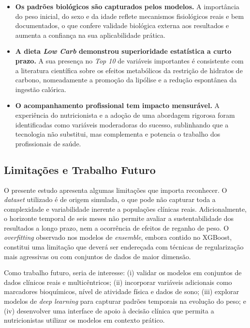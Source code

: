 \begin{itemize}
    \item \textbf{Os padrões biológicos são capturados pelos modelos.} A importância do peso inicial, do sexo e da idade reflete mecanismos fisiológicos reais e bem documentados, o que confere validade biológica externa aos resultados e aumenta a confiança na sua aplicabilidade prática.

    \item \textbf{A dieta \textit{Low Carb} demonstrou superioridade estatística a curto prazo.} A sua presença no \textit{Top 10} de variáveis importantes é consistente com a literatura científica sobre os efeitos metabólicos da restrição de hidratos de carbono, nomeadamente a promoção da lipólise e a redução espontânea da ingestão calórica.

    \item \textbf{O acompanhamento profissional tem impacto mensurável.} A experiência do nutricionista e a adoção de uma abordagem rigorosa foram identificadas como variáveis moderadoras do sucesso, sublinhando que a tecnologia não substitui, mas complementa e potencia o trabalho dos profissionais de saúde.
\end{itemize}

\subsection{Limitações e Trabalho Futuro}

O presente estudo apresenta algumas limitações que importa reconhecer. O \textit{dataset} utilizado é de origem simulada, o que pode não capturar toda a complexidade e variabilidade inerente a populações clínicas reais. Adicionalmente, o horizonte temporal de seis meses não permite avaliar a sustentabilidade dos resultados a longo prazo, nem a ocorrência de efeitos de reganho de peso. O \textit{overfitting} observado nos modelos de \textit{ensemble}, embora contido no XGBoost, constitui uma limitação que deverá ser endereçada com técnicas de regularização mais agressivas ou com conjuntos de dados de maior dimensão.

Como trabalho futuro, seria de interesse: (i) validar os modelos em conjuntos de dados clínicos reais e multicêntricos; (ii) incorporar variáveis adicionais como marcadores bioquímicos, nível de atividade física e dados de sono; (iii) explorar modelos de \textit{deep learning} para capturar padrões temporais na evolução do peso; e (iv) desenvolver uma interface de apoio à decisão clínica que permita a nutricionistas utilizar os modelos em contexto prático.

